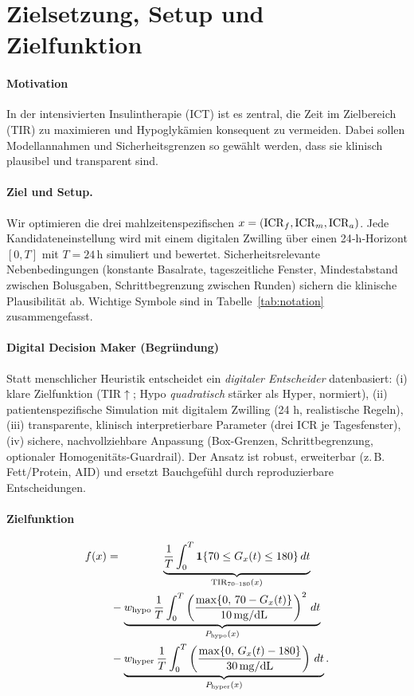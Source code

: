 \section{Zielsetzung, Setup und Zielfunktion}

\paragraph{Motivation}
In der intensivierten Insulintherapie (ICT) ist es zentral, die Zeit im Zielbereich (TIR) zu maximieren und Hypoglykämien konsequent zu vermeiden. Dabei sollen Modellannahmen und Sicherheitsgrenzen so gewählt werden, dass sie klinisch plausibel und transparent sind.

\paragraph{Ziel und Setup.}
Wir optimieren die drei mahlzeitenspezifischen \IKRtxtpl{} \(x=(\mathrm{ICR}_f,\mathrm{ICR}_m,\mathrm{ICR}_a)\). Jede Kandidateneinstellung wird mit einem digitalen Zwilling über einen 24‑h‑Horizont \([0,T]\) mit \(T=24\,\mathrm{h}\) simuliert und bewertet. Sicherheitsrelevante Nebenbedingungen (konstante Basalrate, tageszeitliche Fenster, Mindestabstand zwischen Bolusgaben, Schrittbegrenzung zwischen Runden) sichern die klinische Plausibilität ab. Wichtige Symbole sind in Tabelle~\ref{tab:notation} zusammengefasst.


\paragraph{Digital Decision Maker (Begründung)}
Statt menschlicher Heuristik entscheidet ein \emph{digitaler Entscheider} datenbasiert: (i) klare Zielfunktion (TIR$\uparrow$; Hypo \emph{quadratisch} stärker als Hyper, normiert), (ii) patientenspezifische Simulation mit digitalem Zwilling (24 h, realistische Regeln), (iii) transparente, klinisch interpretierbare Parameter (drei ICR je Tagesfenster), (iv) sichere, nachvollziehbare Anpassung (Box-Grenzen, Schrittbegrenzung, optionaler Homogenitäts-Guardrail). Der Ansatz ist robust, erweiterbar (z.\,B. Fett/Protein, AID) und ersetzt Bauchgefühl durch reproduzierbare Entscheidungen.

\paragraph{Zielfunktion}
\begin{align}
f(x)
&= \phantom{-\,w_{\mathrm{hypo}}\,}\underbrace{\frac{1}{T}\int_{0}^{T}\Ind\{70 \le G_{x}(t) \le 180\}\,dt}_{\mathrm{TIR}_{70\text{--}180}(x)} \nonumber\\
&\ - \underbrace{w_{\mathrm{hypo}}\,\frac{1}{T}\int_{0}^{T}\left(\frac{\max\{0,\,70 - G_{x}(t)\}}{\Hhypo}\right)^{2}\,dt}_{P_{\mathrm{hypo}}(x)} \nonumber\\
&\ - \underbrace{w_{\mathrm{hyper}}\,\frac{1}{T}\int_{0}^{T}\left(\frac{\max\{0,\,G_{x}(t) - 180\}}{\Hhyper}\right)\,dt}_{P_{\mathrm{hyper}}(x)}.
\end{align}

